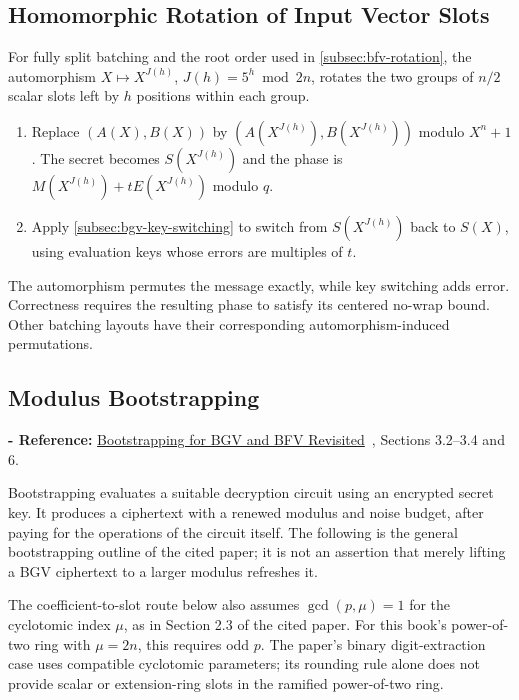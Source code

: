 \subsection{Homomorphic Rotation of Input Vector Slots}
\label{subsec:bgv-rotation}

For fully split batching and the root order used in \autoref{subsec:bfv-rotation}, the automorphism $X\mapsto X^{J(h)}$, $J(h)=5^h\bmod2n$, rotates the two groups of $n/2$ scalar slots left by $h$ positions within each group.
\begin{tcolorbox}[title={\textbf{\tboxlabel{\ref*{subsec:bgv-rotation}} BGV Homomorphic Rotation of Input Vector Slots}}]
\begin{enumerate}
\item Replace $(A(X),B(X))$ by $(A(X^{J(h)}),B(X^{J(h)}))$ modulo $X^n+1$. The secret becomes $S(X^{J(h)})$ and the phase is $M(X^{J(h)})+tE(X^{J(h)})$ modulo $q$.
\item Apply \autoref{subsec:bgv-key-switching} to switch from $S(X^{J(h)})$ back to $S(X)$, using evaluation keys whose errors are multiples of $t$.
\end{enumerate}
\end{tcolorbox}
The automorphism permutes the message exactly, while key switching adds error. Correctness requires the resulting phase to satisfy its centered no-wrap bound. Other batching layouts have their corresponding automorphism-induced permutations.


\subsection{Modulus Bootstrapping}
\label{subsec:bgv-bootstrapping}

\noindent \textbf{- Reference:} \href{https://eprint.iacr.org/2022/1363}{Bootstrapping for BGV and BFV Revisited}~\cite{cryptoeprint:2022/1363}, Sections 3.2--3.4 and 6.

Bootstrapping evaluates a suitable decryption circuit using an encrypted secret key. It produces a ciphertext with a renewed modulus and noise budget, after paying for the operations of the circuit itself. The following is the general bootstrapping outline of the cited paper; it is not an assertion that merely lifting a BGV ciphertext to a larger modulus refreshes it.

The coefficient-to-slot route below also assumes $\gcd(p,\mu)=1$ for the cyclotomic index $\mu$, as in Section 2.3 of the cited paper. For this book's power-of-two ring with $\mu=2n$, this requires odd $p$. The paper's binary digit-extraction case uses compatible cyclotomic parameters; its rounding rule alone does not provide scalar or extension-ring slots in the ramified power-of-two ring.

